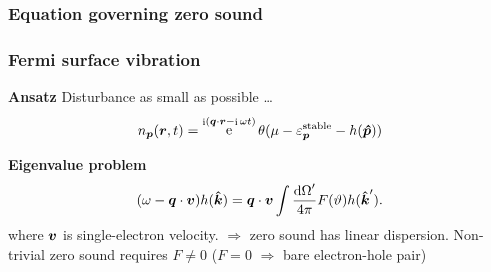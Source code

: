 \documentclass{beamer}
\DeclareMathOperator{\ee}{e}
\DeclareMathOperator{\ii}{i}
\begin{document}
\begin{frame}
\frametitle{Equation governing zero sound}




\end{frame}

\begin{frame}
\frametitle{Fermi surface vibration}

\textbf{Ansatz} Disturbance as small as possible \dots
\begin{equation}
    {n}_{\vb*{p}}(\vb*{r}, t) = \ee^{\ii (\vb*{q} \cdot \vb*{r} - \ii \omega t)} 
    \theta(\mu - \varepsilon_{\vb*{p}}^{\text{stable}} - h(\vu*{p}))
\end{equation}    

\begin{center}
    
\end{center}

\textbf{Eigenvalue problem} \begin{equation}
    (\omega - \vb*{q} \cdot \vb*{v}) h(\vu*{k})
    = \vb*{q} \cdot \vb*{v} \int \frac{\dd{\Omega}'}{4\pi} F(\vartheta) h(\vu*{k}').
\end{equation}
where $\vb*{v}$ is single-electron velocity. $\Rightarrow$ zero sound has linear dispersion.
Non-trivial zero sound requires $F \neq 0$ ($F = 0$ $\Rightarrow$ bare electron-hole pair)

\end{frame}
\end{document}
